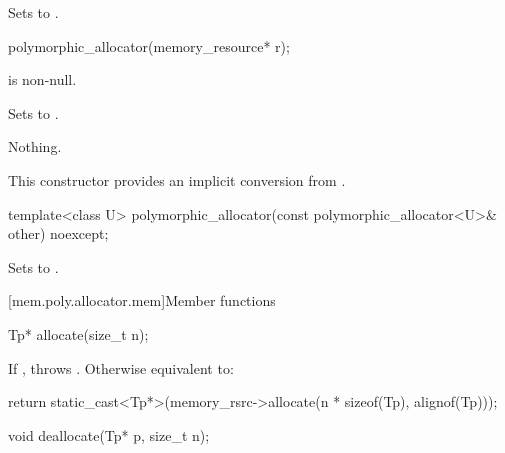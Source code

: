 \begin{itemdescr}
\pnum
\effects
Sets  to .
\end{itemdescr}

%
\begin{itemdecl}
polymorphic_allocator(memory_resource* r);
\end{itemdecl}

\begin{itemdescr}
\pnum
\expects
{} is non-null.

\pnum
\effects
Sets  to .

\pnum
\throws
Nothing.

\pnum
\begin{note}
This constructor provides an implicit conversion from .
\end{note}
\end{itemdescr}

%
\begin{itemdecl}
template<class U> polymorphic_allocator(const polymorphic_allocator<U>& other) noexcept;
\end{itemdecl}

\begin{itemdescr}
\pnum
\effects
Sets  to .
\end{itemdescr}


[mem.poly.allocator.mem]{Member functions}

%
\begin{itemdecl}
Tp* allocate(size_t n);
\end{itemdecl}

\begin{itemdescr}
\pnum
\effects
If ,
throws .
Otherwise equivalent to:
\begin{codeblock}
return static_cast<Tp*>(memory_rsrc->allocate(n * sizeof(Tp), alignof(Tp)));
\end{codeblock}
\end{itemdescr}

%
\begin{itemdecl}
void deallocate(Tp* p, size_t n);
\end{itemdecl}


